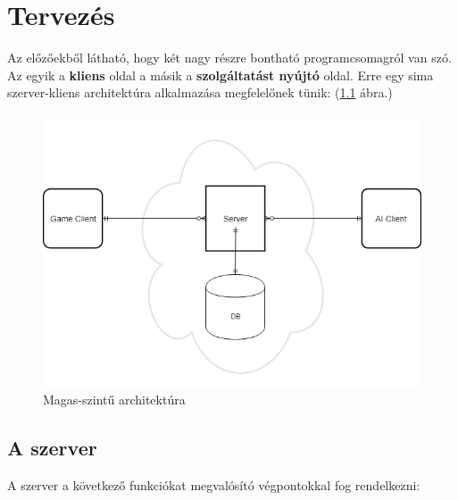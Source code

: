 \documentclass[twoside, a4paper, 12pt]{book}
\begin{document}
\newpage
\chapter{Tervezés}
Az előzőekből látható, hogy két nagy részre bontható programcsomagról van szó. Az egyik a \textbf{kliens} oldal a másik a \textbf{szolgáltatást nyújtó} oldal. Erre egy sima szerver-kliens architektúra alkalmazása megfelelőnek tünik: (\ref{fig:highLevelArchitecture} ábra.)

\begin{figure}[htbp]
	\centering
	\includegraphics[width=1.0\textwidth]{img/highLevelArchitecture.png}
	\caption{Magas-szintű architektúra}
	\label{fig:highLevelArchitecture}
\end{figure}

\section{A szerver}

A szerver a következő funkciókat megvalósító végpontokkal fog rendelkezni:
\end{document}

